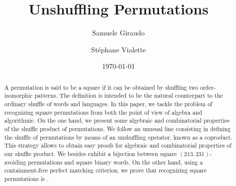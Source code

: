 \documentclass[a4paper]{llncs}
\begin{document}

\title{%
Unshuffling Permutations}%

\author{%
  Samuele Giraudo \and
  St\'ephane Vialette
}%
\date{\today}

\maketitle


\begin{abstract}
    A permutation is said to be a square if it can be obtained by
    shuffling two order-isomorphic patterns. The definition is intended
    to be the natural counterpart to the ordinary shuffle of words and
    languages. In this paper, we tackle the problem of recognizing square
    permutations from both the point of view of algebra and algorithmic.
    On the one hand, we present some algebraic and combinatorial
    properties of the shuffle product of permutations. We follow an
    unusual line consisting in defining the shuffle of permutations by
    means of an unshuffling operator, known as a coproduct. This
    strategy allows to obtain easy proofs for algebraic and combinatorial
    properties of our shuffle product. We besides exhibit a bijection
    between square $(213,231)$-avoiding permutations and square binary
    words.
    On the other hand,
    using a containment-free perfect matching criterion,
    we prove that recognizing square permutations is \NPC.
\end{abstract}


\end{document}
